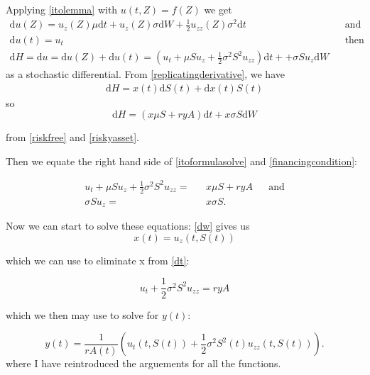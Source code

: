 \documentclass[11pt]{article} %
\begin{document}
Applying \eqref{itolemma} with $u(t,Z) = f(Z)$ we get   
\begin{align}\label{itoformulasolve}
    \mathrm{d}u(Z)  = u_z(Z)\mu \mathrm{d}t + u_z(Z)\sigma \mathrm{d}W + \frac{1}{2}
    u_{zz}(Z) \sigma^2 \mathrm{d}t&& \text{and} \\
    \mathrm{d}u(t) = u_t &&\text{then} \\
    \mathrm{d}H =\mathrm{d}u = \mathrm{d}u(Z) +\mathrm{d}u(t) =   (u_t + \mu S u_z + \frac{1}{2} 
    \sigma^2 S^2 u_{zz})\mathrm{d}t + +\sigma S u_z \mathrm{d}W
\end{align}
as a stochastic differential.
From \eqref{replicatingderivative}, we have
\begin{align}
    \mathrm{d}H = x(t)\mathrm{d}S(t) +\mathrm{d}x(t)S(t) 
\end{align}
so
\begin{equation}\label{financingcondition}
    \mathrm{d}H = (x\mu S + ryA)\mathrm{d}t + x \sigma S \mathrm{d}W 
\end{equation}

from \eqref{riskfree} and \eqref{riskyasset}.

Then we equate the right hand side of \eqref{itoformulasolve} and \eqref{financingcondition}:

\begin{align}\label{dt}
    u_t + \mu S u_z + \frac{1}{2} \sigma^2 S^2 u_{zz}  = &&x\mu S + ryA &&\text{and} \\
    \sigma Su_z =&& x\sigma S.\label{dw}
\end{align}

Now we can start to solve these equations: \eqref{dw} gives us
\begin{equation}
    x(t) = u_z(t,S(t))
\end{equation}

which we can use to eliminate x from \eqref{dt}:

\begin{equation}
    u_t + \frac{1}{2}\sigma ^2 S^2u_{zz} = ryA
\end{equation}

which we then may use to solve for $y(t)$:

\begin{equation}
    y(t) = \frac{1}{rA(t)}(u_t(t,S(t)) + \frac{1}{2} \sigma^2S^2(t)u_{zz}(t,S(t)) ).
\end{equation}
where I have reintroduced the arguements for all the functions.
\end{document}
